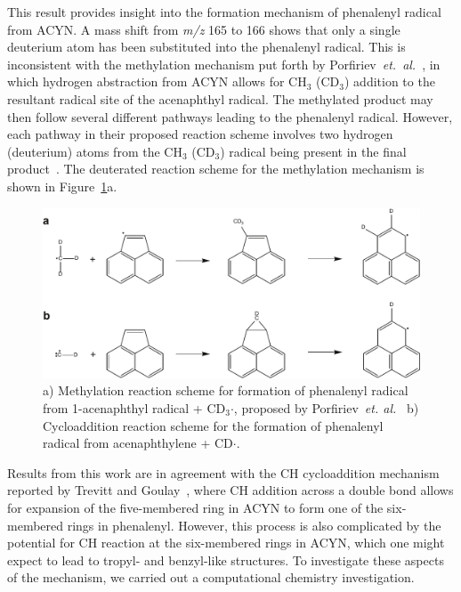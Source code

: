 \documentclass[journal=jacsat,manuscript=article,layout=onecolumn]{achemso}
\begin{document}
This result provides insight into the formation mechanism of phenalenyl radical from ACYN. A mass shift from \textit{m/z} 165 to 166 shows that only a single deuterium atom has been substituted into the phenalenyl radical. This is inconsistent with the methylation mechanism put forth by Porfiriev~\textit{et.}~\textit{al.}~\cite{por20}, in which hydrogen abstraction from ACYN allows for CH$_3$ (CD$_3$) addition to the resultant radical site of the acenaphthyl radical. The methylated product may then follow several different pathways leading to the phenalenyl radical. However, each pathway in their proposed reaction scheme involves two hydrogen (deuterium) atoms from the CH$_3$ (CD$_3$) radical being present in the final product~\cite{por20}. The deuterated reaction scheme for the methylation mechanism is shown in Figure~\ref{fig4}a.

\begin{figure}[h!]
	\includegraphics[width=1\textwidth]{Figures/Figure4}
	\caption{ a) Methylation reaction scheme for formation of phenalenyl radical from 1-acenaphthyl radical + CD$_3$$\cdot$, proposed by Porfiriev~\textit{et. al.}~\cite{por20}
		b) Cycloaddition reaction scheme for the formation of phenalenyl radical from acenaphthylene + CD$\cdot$.}
	\label{fig4}
\end{figure}

Results from this work are in agreement with the CH cycloaddition mechanism reported by Trevitt and Goulay~\cite{tre16}, where CH addition across a double bond allows for expansion of the five-membered ring in ACYN to form one of the six-membered rings in phenalenyl. However, this process is also complicated by the potential for CH reaction at the six-membered rings in ACYN, which one might expect to lead to tropyl- and benzyl-like structures. To investigate these aspects of the mechanism, we carried out a computational chemistry investigation.
\end{document}
